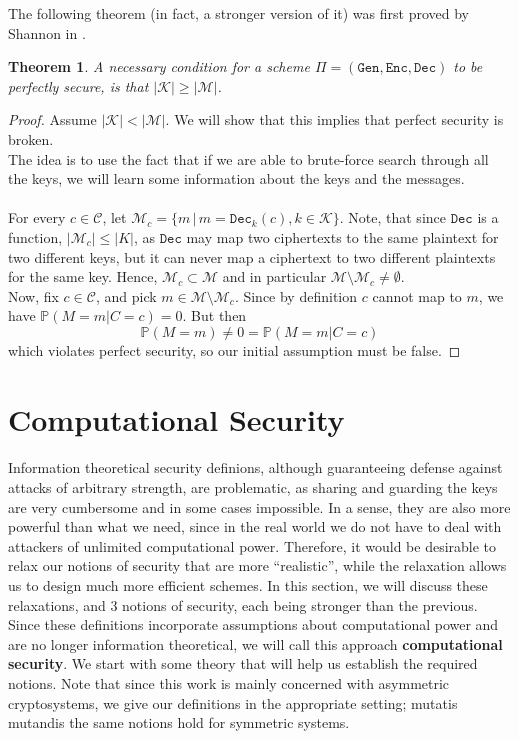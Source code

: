 \documentclass{article}
\newtheorem{theorem}{Theorem}[section]
\theoremstyle{definition}
\theoremstyle{example}
\newcommand{\Enc}{\texttt{Enc}}
\newcommand{\Dec}{\texttt{Dec}}
\newcommand{\Gen}{\texttt{Gen}}
\newcommand{\M}{\mathcal{M}}
\renewcommand{\C}{\mathcal{C}}
\newcommand{\K}{\mathcal{K}}
\newcommand{\Prob}{\mathbb{P}}
\begin{document}
The following theorem (in fact, a stronger version of it) was first proved by
Shannon in \cite{shannon1949communication}.
\begin{theorem}
A necessary condition for a scheme $\Pi = (\Gen, \Enc, \Dec)$ to be perfectly secure, is that $|\K|
\geq |\M|$.
\end{theorem}
\begin{proof}
  Assume $|\K| < |\M|$. We will show that this implies that perfect security is broken.\\
  The idea is to use the fact that if we are able to brute-force search through
  all the keys, we will learn some information about the keys and the messages.
  \paragraph{}
  For every $c \in \C$, let $\M_c = \{m \,|\, m = \Dec_k(c), k \in \K\}$.
  Note, that since $\Dec$ is a function, $|\M_c| \leq |K|$, as $\Dec$ may map two ciphertexts
  to the same plaintext for two different keys, but it can never map a
  ciphertext to two different plaintexts for the same key. Hence, $\M_c \subset
  \M$ and in particular $\M \setminus \M_c \neq \emptyset$.\\
  Now, fix $c \in \C$, and pick $m \in \M \setminus \M_c$. Since by definition
  $c$ cannot map to $m$, we have $\Prob(M=m | C = c) = 0$. But then
  \[
    \Prob(M=m) \neq 0 = \Prob(M=m | C=c)
  \]
  which violates perfect security, so our initial assumption must be false.
\end{proof}
\section{Computational Security}
\paragraph{}
Information theoretical security definions, although guaranteeing defense
against attacks of arbitrary strength, are problematic, as sharing and guarding
the keys are very cumbersome and in some cases impossible. In a sense, they are
also more powerful than what we need, since in the real world we do not have to
deal with attackers of unlimited computational power. Therefore, it would be
desirable to relax our notions of security that are more ``realistic'', while
the relaxation allows us to design much more efficient schemes.
In this section, we will discuss these relaxations, and 3 notions of security,
each being stronger than the previous. Since these definitions incorporate
assumptions about computational power and are no longer information theoretical,
we will call this approach \textbf{computational security}. We start with some
theory that will help us establish the required notions. Note that since this
work is mainly concerned with asymmetric cryptosystems, we give our definitions
in the appropriate setting; mutatis mutandis the same notions hold for symmetric systems.
\end{document}
